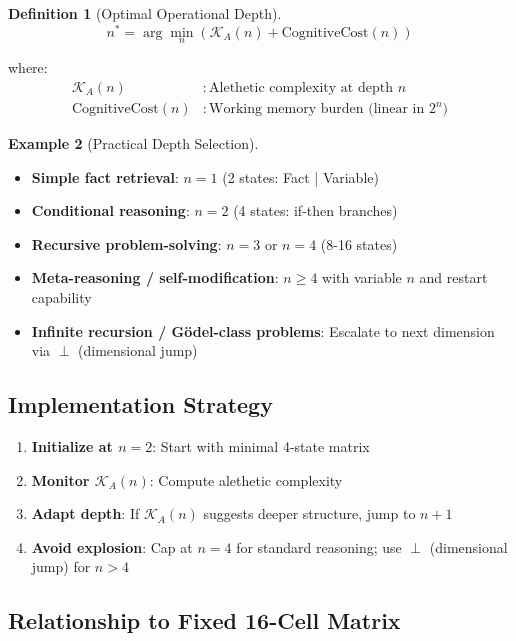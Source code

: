 \documentclass[12pt,a4paper]{article}
\theoremstyle{definition}
\newtheorem{definition}{Definition}[section]
\newtheorem{example}[definition]{Example}
\newcommand{\kal}{\mathcal{K}_A}
\begin{document}
\begin{definition}[Optimal Operational Depth]
\begin{equation}
n^* = \arg\min_n \left( \kal(n) + \text{CognitiveCost}(n) \right)
\end{equation}

where:
\begin{align}
\kal(n) &: \text{Alethetic complexity at depth } n \\
\text{CognitiveCost}(n) &: \text{Working memory burden (linear in } 2^n \text{)}
\end{align}
\end{definition}

\begin{example}[Practical Depth Selection]
\begin{itemize}
    \item \textbf{Simple fact retrieval}: $n=1$ (2 states: Fact | Variable)
    \item \textbf{Conditional reasoning}: $n=2$ (4 states: if-then branches)
    \item \textbf{Recursive problem-solving}: $n=3$ or $n=4$ (8-16 states)
    \item \textbf{Meta-reasoning / self-modification}: $n \geq 4$ with variable $n$ and restart capability
    \item \textbf{Infinite recursion / Gödel-class problems}: Escalate to next dimension via $\perp$ (dimensional jump)
\end{itemize}
\end{example}

\subsection{Implementation Strategy}

\begin{enumerate}
    \item \textbf{Initialize at $n=2$}: Start with minimal 4-state matrix
    \item \textbf{Monitor $\kal(n)$}: Compute alethetic complexity
    \item \textbf{Adapt depth}: If $\kal(n)$ suggests deeper structure, jump to $n+1$
    \item \textbf{Avoid explosion}: Cap at $n=4$ for standard reasoning; use $\perp$ (dimensional jump) for $n > 4$
\end{enumerate}

\subsection{Relationship to Fixed 16-Cell Matrix}
\end{document}
